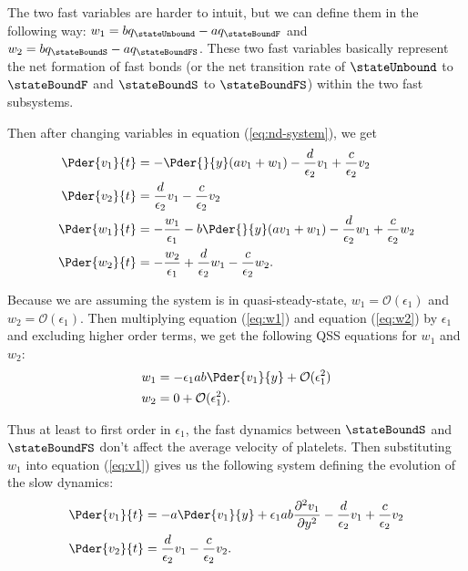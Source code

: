 The two fast variables are harder to intuit, but we can define them in
the following way:
$w_1 = b q_\stateUnbound - a q_\stateBoundF$ and
$w_2 = b q_\stateBoundS - a q_\stateBoundFS$. These two fast variables
basically represent the net formation of fast bonds (or the net
transition rate of $\stateUnbound$ to $\stateBoundF$ and
$\stateBoundS$ to $\stateBoundFS$) within the two fast subsystems.

Then after changing variables in equation (\ref{eq:nd-system}), we
get
\begin{align}
  \Pder{v_1}{t} &= -\Pder{}{y}(a v_1 + w_1) - \frac{d}{\epsilon_2} v_1
                  + \frac{c}{\epsilon_2} v_2 \label{eq:v1} \\
  \Pder{v_2}{t} &= \frac{d}{\epsilon_2} v_1 - \frac{c}{\epsilon_2} v_2
  \label{eq:v2} \\
  \Pder{w_1}{t} &= -\frac{w_1}{\epsilon_1} - b\Pder{}{y} (a v_1 + w_1)
                  - \frac{d}{\epsilon_2} w_1 + \frac{c}{\epsilon_2}
                  w_2 \label{eq:w1} \\
  \Pder{w_2}{t} &= -\frac{w_2}{\epsilon_1} + \frac{d}{\epsilon_2} w_1
                  - \frac{c}{\epsilon_2} w_2. \label{eq:w2}
\end{align}

Because we are assuming the system is in quasi-steady-state,
$w_1 = \mathcal{O}(\epsilon_1)$ and $w_2 =
\mathcal{O}(\epsilon_1)$. Then multiplying equation (\ref{eq:w1}) and
equation (\ref{eq:w2}) by $\epsilon_1$ and excluding higher order terms,
we get the following QSS equations for $w_1$ and $w_2$:
\begin{align}
  \label{eq:w1-reduced}
  w_1 &= -\epsilon_1 a b \Pder{v_1}{y} + \mathcal{O}(\epsilon_1^2) \\
  \label{eq:w2-reduced}
  w_2 &= 0 + \mathcal{O}(\epsilon_1^2).
\end{align}

Thus at least to first order in $\epsilon_1$, the fast dynamics
between $\stateBoundS$ and $\stateBoundFS$ don't affect the average
velocity of platelets. Then substituting $w_1$ into equation
(\ref{eq:v1}) gives us the following system defining the evolution of
the slow dynamics:
\begin{align}
  \label{eq:v1-reduced}
  \Pder{v_1}{t} &= -a \Pder{v_1}{y} + \epsilon_1 a b \frac{\partial^2
                  v_1}{\partial y^2} - \frac{d}{\epsilon_2} v_1 +
                  \frac{c}{\epsilon_2} v_2 \\
  \label{eq:v2-reduced}
  \Pder{v_2}{t} &= \frac{d}{\epsilon_2} v_1 - \frac{c}{\epsilon_2} v_2.
\end{align}

